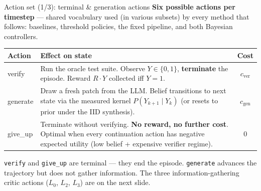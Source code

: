 \documentclass[10pt]{beamer}
\newcommand{\info}[1]{\textcolor{primaryBlue}{\textbf{#1}}}
\begin{document}
\begin{frame}{Action set (1/3): terminal \& generation actions}
\info{Six possible actions per timestep} --- shared vocabulary used (in
various subsets) by every method that follows: baselines, threshold
policies, the fixed pipeline, and both Bayesian controllers.

\vspace{0.2cm}
\begin{table}
\centering
\small
\begin{tabular}{>{\ttfamily}lp{7.0cm}c}
\toprule
\rowcolor{paleBlue}\textnormal{\textbf{Action}} & \textnormal{\textbf{Effect on state}} & \textnormal{\textbf{Cost}} \\
\midrule
verify   & Run the oracle test suite. Observe $Y \in \{0,1\}$,
           \textbf{terminate} the episode. Reward $R \cdot Y$ collected iff
           $Y{=}1$. & $c_\text{ver}$ \\
\addlinespace[4pt]
generate & Draw a fresh patch from the LLM. Belief transitions to next state
           via the measured kernel $P(Y_{k+1}{\mid}Y_k)$ (or resets to prior
           under the IID synthesis). & $c_\text{gen}$ \\
\addlinespace[4pt]
give\_up & Terminate without verifying. \textbf{No reward, no further cost}.
           Optimal when every continuation action has negative expected
           utility (low belief + expensive verifier regime). & $0$ \\
\bottomrule
\end{tabular}
\end{table}

\vspace{0.3cm}
\textcolor{softGrey}{\scriptsize \texttt{verify} and \texttt{give\_up} are
terminal --- they end the episode. \texttt{generate} advances the trajectory
but does not gather information. The three information-gathering critic
actions ($L_0$, $L_2$, $L_3$) are on the next slide.}
\end{frame}
\end{document}
